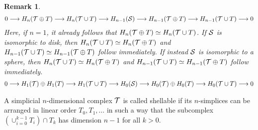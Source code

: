 \documentclass[a4paper]{article}
\newtheorem{remark}{Remark}
\begin{document}
\begin{remark}
\begin{align*}
\begin{CD}
            0 \longrightarrow H_{n}(\calT \oplus T) \longrightarrow H_{n}(\calT \cup T) \longrightarrow H_{n-1}(\calS) \longrightarrow H_{n-1}(\calT \oplus T) \longrightarrow H_{n-1}(\calT \cup T) \longrightarrow 0 
        \end{CD}
    \end{align*}
    Here, if $n=1$, it already follows that $H_{n}({\mathcal T} \oplus T) \simeq H_{n}({\mathcal T} \cup T)$.
    If ${\mathcal S}$ is isomorphic to disk,
    then $H_{n}({\mathcal T} \cup T) \simeq H_{n}({\mathcal T} \oplus T)$ and $H_{n-1}({\mathcal T} \cup T) \simeq H_{n-1}({\mathcal T} \oplus T)$ follow immediately.
    If instead ${\mathcal S}$ is isomorphic to a sphere, 
    then $H_{n}({\mathcal T} \cup T) \simeq H_{n}({\mathcal T} \oplus T)$ and $H_{n-1}({\mathcal T} \cup T) \simeq H_{n-1}({\mathcal T} \oplus T)$ follow immediately.
    \begin{align*}
        \begin{CD}
            0 \longrightarrow H_{1}(\calT) \oplus H_{1}(T) \longrightarrow H_{1}(\calT \cup T) \longrightarrow H_{0}(\calS) \longrightarrow H_{0}(\calT) \oplus H_{0}(T) \longrightarrow H_{0}(\calT \cup T) \longrightarrow 0 
        \end{CD}
    \end{align*}
\end{remark}

A simplicial $n$-dimensional complex ${\mathcal T}$ is called shellable if its $n$-simplices can be arranged in linear order $T_0, T_1, \dots$ in such a way that the subcomplex $( \cup_{i=0}^{k-1} T_i ) \cap T_k$ has dimension $n-1$ for all $k > 0$.



\end{document}

